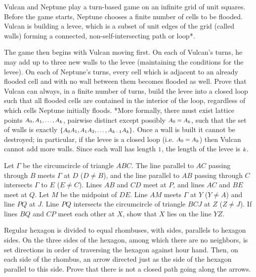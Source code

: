 \documentclass[11pt]{scrartcl}
\begin{document}
\begin{problem}[6064010778487493566]
Vulcan and Neptune play a turn-based game on an infinite grid of unit squares. Before the game starts, Neptune chooses a finite number of cells to be flooded. Vulcan is building a levee, which is a subset of unit edges of the grid (called walls) forming a connected, non-self-intersecting path or loop*.

The game then begins with Vulcan moving first. On each of Vulcan’s turns, he may add up to three new walls to the levee (maintaining the conditions for the levee). On each of Neptune’s turns, every cell which is adjacent to an already flooded cell and with no wall between them becomes flooded as well. Prove that Vulcan can always, in a finite number of turns, build the levee into a closed loop such that all flooded cells are contained in the interior of the loop, regardless of which cells Neptune initially floods.
*More formally, there must exist lattice points $\mbox{\footnotesize \(A_0, A_1, \dotsc, A_k\)}$, pairwise distinct except possibly $\mbox{\footnotesize \(A_0 = A_k\)}$, such that the set of walls is exactly $\mbox{\footnotesize \(\{A_0A_1, A_1A_2, \dotsc , A_{k-1}A_k\}\)}$. Once a wall is built it cannot be destroyed; in particular, if the levee is a closed loop (i.e. $\mbox{\footnotesize \(A_0 = A_k\)}$) then Vulcan cannot add more walls. Since each wall has length $\mbox{\footnotesize \(1\)}$, the length of the levee is $\mbox{\footnotesize \(k\)}$.
\end{problem}
\begin{problem}[541615131309445]
	Let $\Gamma$ be the circumcircle of triangle $ABC$. The line parallel to $AC$ passing through $B$ meets $\Gamma$ at $D$ ($D\neq B$), and the line parallel to $AB$ passing through $C$ intersects $\Gamma$ to $E$ ($E\neq C$). Lines $AB$ and $CD$ meet at $P$, and lines $AC$ and $BE$ meet at $Q$. Let $M$ be the midpoint of $DE$. Line $AM$ meets $\Gamma$ at $Y$ ($Y\neq A$) and line $PQ$ at $J$. Line $PQ$ intersects the circumcircle of triangle $BCJ$ at $Z$ ($Z\neq J$). If lines $BQ$ and $CP$ meet each other at $X$, show that $X$ lies on the line $YZ$.
\end{problem}
\begin{problem}[6576585943791349484]
Regular hexagon is divided to equal rhombuses, with sides, parallels to hexagon sides. On the three sides of the hexagon, among which there are no neighbors, is set directions in order of traversing the hexagon against hour hand. Then, on each side of the rhombus, an arrow directed just as the side of the hexagon parallel to this side. Prove that there is not a closed path going along the arrows.
\end{problem}
\end{document}
